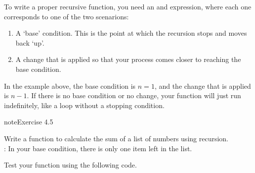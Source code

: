 \documentclass[letterpaper,10pt,english]{jupyterBook}
\begin{document}
\sphinxAtStartPar
To write a proper recursive function, you need an  and  expression, where each one corresponds to one of the two scenarions:
\begin{enumerate}
%
\item {} 
\sphinxAtStartPar
A ‘base’ condition. This is the point at which the recursion stops and moves back ‘up’.

\item {} 
\sphinxAtStartPar
A change that is applied so that your process comes closer to reaching the base condition.

\end{enumerate}

\sphinxAtStartPar
In the example above, the base condition is \(n=1\), and the change that is applied is \(n-1\). If there is no base condition or no change, your function will just run indefinitely, like a  loop without a stopping condition.

\begin{sphinxadmonition}{note}{Exercise 4.5}

\sphinxAtStartPar
Write a function  to calculate the sum of a list of numbers using recursion.\\
: In your base condition, there is only one item left in the list.

\sphinxAtStartPar
Test your function using the following code.

\begin{sphinxVerbatim}[commandchars=\\\{\}]
 
    
  \PYG{p}{[}      \PYG{p}{]}
  
 
\end{sphinxVerbatim}
\end{sphinxadmonition}
\end{document}
